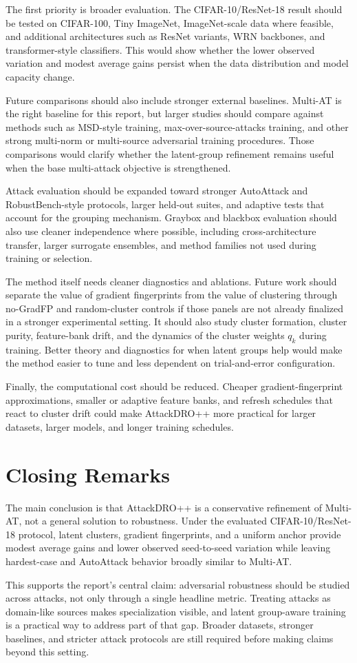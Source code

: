 The first priority is broader evaluation.  The CIFAR-10/ResNet-18 result should
be tested on CIFAR-100, Tiny ImageNet, ImageNet-scale data where feasible, and
additional architectures such as ResNet variants, WRN backbones, and
transformer-style classifiers.  This would show whether the lower observed
variation and modest average gains persist when the data distribution and model
capacity change.

Future comparisons should also include stronger external baselines.  Multi-AT
is the right baseline for this report, but larger studies should compare against
methods such as MSD-style training, max-over-source-attacks training, and other
strong multi-norm or multi-source adversarial training procedures.  Those
comparisons would clarify whether the latent-group refinement remains useful
when the base multi-attack objective is strengthened.

Attack evaluation should be expanded toward stronger AutoAttack and
RobustBench-style protocols, larger held-out suites, and adaptive tests that
account for the grouping mechanism.  Graybox and blackbox evaluation should also
use cleaner independence where possible, including cross-architecture transfer,
larger surrogate ensembles, and method families not used during training or
selection.

The method itself needs cleaner diagnostics and ablations.  Future work should
separate the value of gradient fingerprints from the value of clustering through
no-GradFP and random-cluster controls if those panels are not already finalized
in a stronger experimental setting.  It should also study cluster formation,
cluster purity, feature-bank drift, and the dynamics of the cluster weights
$q_k$ during training.  Better theory and diagnostics for when latent groups
help would make the method easier to tune and less dependent on trial-and-error
configuration.

Finally, the computational cost should be reduced.  Cheaper gradient-fingerprint
approximations, smaller or adaptive feature banks, and refresh schedules that
react to cluster drift could make AttackDRO++ more practical for larger
datasets, larger models, and longer training schedules.

\section{Closing Remarks}

The main conclusion is that AttackDRO++ is a conservative refinement of
Multi-AT, not a general solution to robustness.  Under the evaluated
CIFAR-10/ResNet-18 protocol, latent clusters, gradient fingerprints, and a
uniform anchor provide modest average gains and lower observed seed-to-seed
variation while leaving hardest-case and AutoAttack behavior broadly similar to
Multi-AT.

This supports the report's central claim: adversarial robustness should be
studied across attacks, not only through a single headline metric.  Treating
attacks as domain-like sources makes specialization visible, and latent
group-aware training is a practical way to address part of that gap.  Broader
datasets, stronger baselines, and stricter attack protocols are still required
before making claims beyond this setting.
